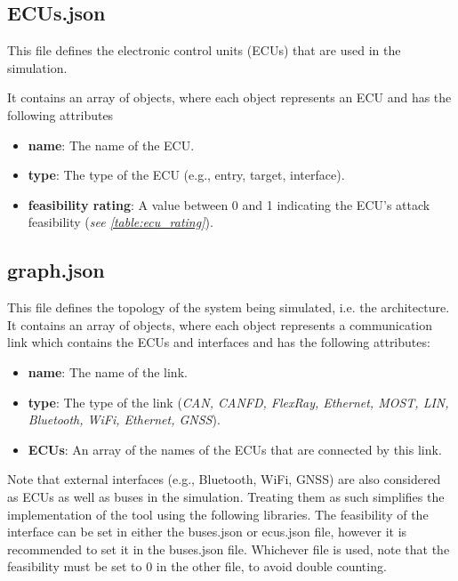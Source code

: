 \subsection{ECUs.json}
\label{sec:ECUs}

This file defines the electronic control units (ECUs) that are used in the simulation. 

It contains an array of objects, where each object represents an ECU and has the following attributes

\begin{itemize}
\item \textbf{name}: The name of the ECU.
\item \textbf{type}: The type of the ECU (e.g., entry, target, interface).
\item \textbf{feasibility rating}: A value between 0 and 1 indicating the ECU's attack feasibility (\textit{see \ref{table:ecu_rating}}).
\end{itemize}

\subsection{graph.json}
\label{sec:graph}

This file defines the topology of the system being simulated, i.e. the architecture. 
It contains an array of objects, where each object represents a communication link which contains the ECUs and interfaces and has the following attributes:

\begin{itemize}
\item \textbf{name}: The name of the link.
\item \textbf{type}: The type of the link (\textit{CAN, CANFD, FlexRay, Ethernet, MOST, LIN, Bluetooth, WiFi, Ethernet, GNSS}).
\item \textbf{ECUs}: An array of the names of the ECUs that are connected by this link.
\end{itemize}

Note that external interfaces (e.g., Bluetooth, WiFi, GNSS) are also considered as ECUs as well as buses in the simulation.
Treating them as such simplifies the implementation of the tool using the following libraries.
The feasibility of the interface can be set in either the buses.json or ecus.json file, however it is recommended to set it in the buses.json file.
Whichever file is used, note that the feasibility must be set to 0 in the other file, to avoid double counting.


